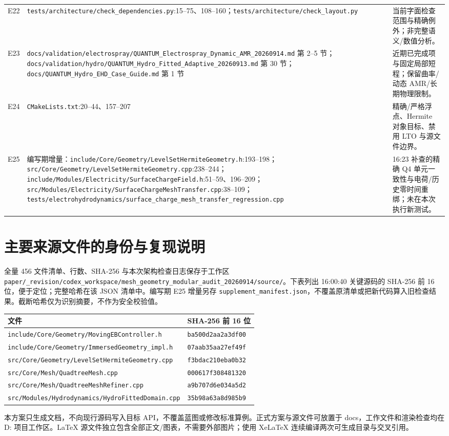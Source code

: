 \documentclass[UTF8,a4paper,11pt,fontset=fandol]{ctexart}
\newcommand{\code}[1]{\nolinkurl{#1}}
\begin{document}
\begin{longtable}{@{}P{.07\textwidth}P{.58\textwidth}P{.29\textwidth}@{}}
E22 & \code{tests/architecture/check_dependencies.py}:15--75、108--160；\code{tests/architecture/check_layout.py} & 当前字面检查范围与精确例外；非完整语义/数值分析。\\
E23 & \code{docs/validation/electrospray/QUANTUM_Electrospray_Dynamic_AMR_20260914.md} 第 2--5 节；\code{docs/validation/hydro/QUANTUM_Hydro_Fitted_Adaptive_20260913.md} 第 30 节；\code{docs/QUANTUM_Hydro_EHD_Case_Guide.md} 第 1 节 & 近期已完成项与固定局部短程；保留曲率/动态 AMR/长期物理限制。\\
E24 & \code{CMakeLists.txt}:20--44、157--207 & 精确/严格浮点、Hermite 对象目标、禁用 LTO 与源文件边界。\\
E25 & 编写期增量：\code{include/Core/Geometry/LevelSetHermiteGeometry.h}:193--198；\code{src/Core/Geometry/LevelSetHermiteGeometry.cpp}:238--244；\code{include/Modules/Electricity/SurfaceChargeField.h}:51--59、196--209；\code{src/Modules/Electricity/SurfaceChargeMeshTransfer.cpp}:38--109；\code{tests/electrohydrodynamics/surface_charge_mesh_transfer_regression.cpp} & 16:23 补查的精确 Q4 单元一致性与电荷/历史零时间重绑；未在本次执行新测试。\\
\bottomrule
\end{longtable}
\normalsize

\section{主要来源文件的身份与复现说明}
全量 456 文件清单、行数、SHA-256 与本次架构检查日志保存于工作区 \code{paper/_revision/codex_workspace/mesh_geometry_modular_audit_20260914/source/}。下表列出 16:00:40 关键源码的 SHA-256 前 16 位，便于定位；完整哈希在该 JSON 清单中。编写期 E25 增量另存 \code{supplement_manifest.json}，不覆盖原清单或把新代码算入旧检查结果。截断哈希仅为识别摘要，不作为安全校验值。
\small
\begin{longtable}{@{}P{.69\textwidth}P{.25\textwidth}@{}}
\toprule 文件 & SHA-256 前 16 位\\\midrule\endhead
\code{include/Core/Geometry/MovingEBController.h} & \code{ba500d2aa2a3df00}\\
\code{include/Core/Geometry/ImmersedGeometry_impl.h} & \code{07aab35aa27ef49f}\\
\code{src/Core/Geometry/LevelSetHermiteGeometry.cpp} & \code{f3bdac210eba0b32}\\
\code{src/Core/Mesh/QuadtreeMesh.cpp} & \code{000617f308481320}\\
\code{src/Core/Mesh/QuadtreeMeshRefiner.cpp} & \code{a9b707d6e034a5d2}\\
\code{src/Modules/Hydrodynamics/HydroFittedDomain.cpp} & \code{35b98a63a8d985b9}\\
\bottomrule
\end{longtable}
\normalsize
本方案只生成文档，不向现行源码写入目标 API，不覆盖蓝图或修改标准算例。正式方案与源文件可放置于 docs，工作文件和渲染检查均在 D: 项目工作区。LaTeX 源文件独立包含全部正文/图表，不需要外部图片；使用 XeLaTeX 连续编译两次可生成目录与交叉引用。
\end{document}
